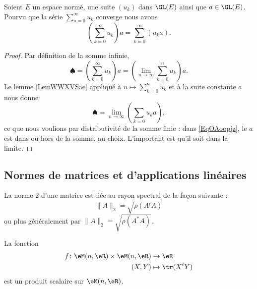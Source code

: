 \begin{proposition} \label{PropQXqEPuG}
    Soient \( E\) un espace normé, une suite \( (u_k)\) dans \( \GL(E)\) ainsi que \( a\in\GL(E)\). Pourvu que la série \( \sum_{n=0}^{\infty}u_k\) converge nous avons
    \begin{equation}
        \left( \sum_{k=0}^{\infty}u_k \right)a=\sum_{k=0}^{\infty}(u_ka).
    \end{equation}
\end{proposition}

\begin{proof}
    Par définition de la somme infinie,
    \begin{equation}
        \spadesuit=\left( \sum_{k=0}^{\infty}u_k \right)a=\left( \lim_{n\to \infty} \sum_{k=0}^nu_k \right)a.
    \end{equation}
    Le lemme \ref{LemWWXVSae} appliqué à \( n\mapsto\sum_{k=0}^nu_k\) et à la suite constante \( a\) nous donne
    \begin{equation}    \label{EqOAoopjz}
        \spadesuit=\lim_{n\to \infty} \left( \sum_{k=0}u_ka \right),
    \end{equation}
    ce que nous voulions par distributivité de la somme finie : dans \eqref{EqOAoopjz}, le \( a\) est dans ou hors de la somme, au choix. L'important est qu'il soit dans la limite.
\end{proof}

\subsection{Normes de matrices et d'applications linéaires}
\label{subsecNomrApplLin}

\begin{theorem}       \label{THOooNDQSooOUWQrK}
    La norme $2$ d'une matrice est liée au rayon spectral de la façon suivante :
    \begin{equation}
        \|A\|_2=\sqrt{\rho(A{^t}A)}
    \end{equation}
    ou plus généralement par \( \| A \|_2=\sqrt{\rho(A^*A)}\).
\end{theorem}

\begin{proposition} \label{PropMAQoKAg}
    La fonction
    \begin{equation}
        \begin{aligned}
            f\colon \eM(n,\eR)\times \eM(n,\eR)&\to \eR \\
            (X,Y)&\mapsto \tr(X^tY) 
        \end{aligned}
    \end{equation}
    est un produit scalaire sur \( \eM(n,\eR)\).
\end{proposition}

